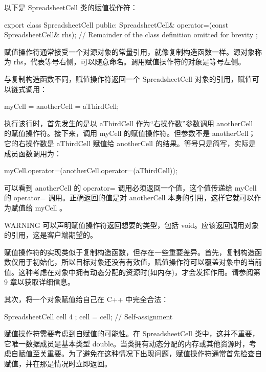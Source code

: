 
以下是 SpreadsheetCell 类的赋值操作符：

\begin{cpp}
export class SpreadsheetCell
{
    public:
        SpreadsheetCell& operator=(const SpreadsheetCell& rhs);
        // Remainder of the class definition omitted for brevity
};
\end{cpp}

赋值操作符通常接受一个对源对象的常量引用，就像复制构造函数一样。源对象称为 rhs，代表等号右侧，可以随意命名。调用赋值操作符的对象是等号左侧。

与复制构造函数不同，赋值操作符返回一个 SpreadsheetCell 对象的引用，赋值可以链式调用：

\begin{cpp}
myCell = anotherCell = aThirdCell;
\end{cpp}

执行该行时，首先发生的是以 aThirdCell 作为“右操作数”参数调用 anotherCell 的赋值操作符。接下来，调用 myCell 的赋值操作符。但参数不是 anotherCell；它的右操作数是 aThirdCell 赋值给 anotherCell 的结果。等号只是简写，实际是成员函数调用为：

\begin{cpp}
myCell.operator=(anotherCell.operator=(aThirdCell));
\end{cpp}

可以看到 anotherCell 的 operator= 调用必须返回一个值，这个值传递给 myCell 的 operator= 调用。正确返回的值是对 anotherCell 本身的引用，这样它就可以作为赋值给 myCell 。

\begin{myWarning}{WARNING}
可以声明赋值操作符返回想要的类型，包括 void。应该返回调用对象的引用，这是客户端期望的。
\end{myWarning}


赋值操作符的实现类似于复制构造函数，但存在一些重要差异。首先，复制构造函数仅用于初始化，所以目标对象还没有有效值，赋值操作符可以覆盖对象中的当前值。这种考虑在对象中拥有动态分配的资源时(如内存)，才会发挥作用。请参阅第 9 章以获取详细信息。

其次，将一个对象赋值给自己在 C++ 中完全合法：

\begin{cpp}
SpreadsheetCell cell { 4 };
cell = cell; // Self-assignment
\end{cpp}

赋值操作符需要考虑到自赋值的可能性。在 SpreadsheetCell 类中，这并不重要，它唯一数据成员是基本类型 double。当类拥有动态分配的内存或其他资源时，考虑自赋值至关重要。为了避免在这种情况下出现问题，赋值操作符通常首先检查自赋值，并在那是情况时立即返回。


